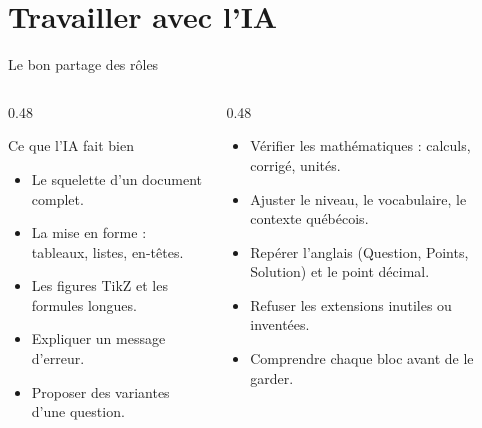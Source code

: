 \section{Travailler avec l'IA}

\begin{frame}{Le bon partage des rôles}
  \small
  \begin{columns}[T]
    \begin{column}{0.48\textwidth}
      \begin{Rem}{Ce que l'IA fait bien}
        \footnotesize
        \begin{itemize}
          \item Le squelette d'un document complet.
          \item La mise en forme : tableaux, listes, en-têtes.
          \item Les figures TikZ et les formules longues.
          \item Expliquer un message d'erreur.
          \item Proposer des variantes d'une question.
        \end{itemize}
      \end{Rem}
    \end{column}
    \begin{column}{0.48\textwidth}
      \begin{AuTableau}
        \footnotesize
        \begin{itemize}
          \item Vérifier les mathématiques : calculs, corrigé, unités.
          \item Ajuster le niveau, le vocabulaire, le contexte québécois.
          \item Repérer l'anglais (Question, Points, Solution) et le
            point décimal.
          \item Refuser les extensions inutiles ou inventées.
          \item Comprendre chaque bloc avant de le garder.
        \end{itemize}
      \end{AuTableau}
    \end{column}
  \end{columns}
\end{frame}

